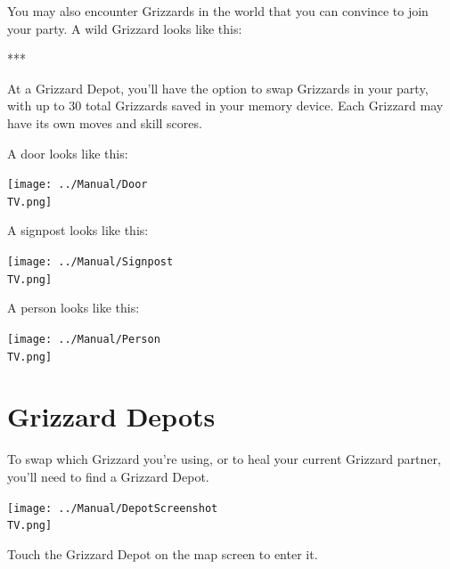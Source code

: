 \documentclass[10pt,twocolumn,openany,article]{memoir}
\newcommand\TV{NTSC}
\newcommand\TV{PAL}
\newcommand\TV{SECAM}
\begin{document}
\else

You may also  encounter Grizzards in the world that  you can convince to
join your party. A wild Grizzard looks like this:

***

At a  Grizzard Depot, you'll have  the option to swap  Grizzards in your
party,  with up  to  30 total  Grizzards saved  in  your memory  device.
Each Grizzard may have its own moves and skill scores.

\fi

A door looks like this:

\begin{center}
  \texttt{[image: ../Manual/Door\\TV.png]}
\end{center}

A signpost looks like this:

\begin{center}
  \texttt{[image: ../Manual/Signpost\\TV.png]}
\end{center}

A person looks like this:

\begin{center}
  \texttt{[image: ../Manual/Person\\TV.png]}
\end{center}

\section{Grizzard Depots}

To \ifdefined\DEMO\else  swap which  Grizzard you're using,  or to  \fi heal
your current Grizzard partner, you'll need to find a Grizzard Depot.

\texttt{[image: ../Manual/DepotScreenshot\\TV.png]}

Touch the Grizzard Depot on the map screen to enter it.
\end{document}
